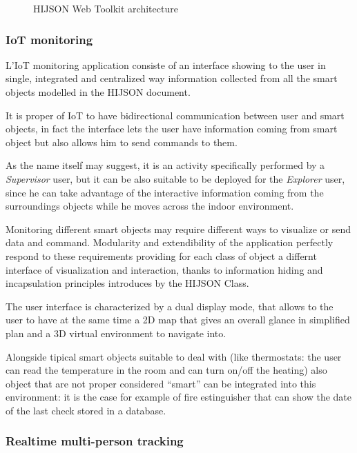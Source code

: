 \begin{figure*}[htb]
\centering
{}
\caption{HIJSON Web Toolkit architecture}
\label{fig:architecture}
\end{figure*}


\subsubsection{IoT monitoring}\label{iot-monitoring}

L'IoT monitoring application consiste of an interface showing to the user in single, integrated and centralized way information collected from all the smart objects modelled in the HIJSON document.

It is proper of IoT to have bidirectional communication between user and smart objects, in fact the interface lets the user have information coming from smart object but also allows him to send commands to them. 

As the name itself may suggest, it is an activity specifically performed by a \emph{Supervisor} user, but it can be also suitable to be deployed for the \emph{Explorer} user, since he can take advantage of the interactive information coming from the surroundings objects while he moves across the indoor environment.

Monitoring different smart objects may require different ways to visualize or send data and command.
Modularity and extendibility of the application perfectly respond to these requirements providing for each class of object a differnt interface of visualization and interaction, thanks to information hiding and incapsulation principles introduces by the HIJSON Class.

The user interface is characterized by a dual display mode, that allows to the user to have at the same time a 2D map that gives an overall glance in simplified plan and a 3D virtual environment to navigate into.

Alongside tipical smart objects suitable to deal with (like thermostats: the user can read the temperature in the room and can turn on/off the heating) also object that are not proper considered ``smart'' can be integrated into this environment: it is the case for example of fire estinguisher that can show the date of the last check stored in a database.

\subsubsection{Realtime multi-person tracking}\label{realtime-multi-person-tracking}

